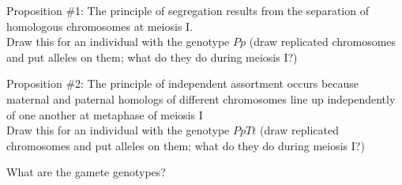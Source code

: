 \begin{frame}[t]
    \begin{adjustwidth}{-2em}{-2em}
    \vspace{-4mm}
    Proposition \#1: The principle of segregation results from the separation
    of homologous chromosomes at meiosis I. \\

    \vspace{3mm}
    Draw this for an individual with the genotype $Pp$ (draw replicated
    chromosomes and put alleles on them; what do they do during meiosis I?) \\

    
    \end{adjustwidth}

\end{frame}

\begin{frame}[t]
    \begin{adjustwidth}{-2em}{-2em}
    \vspace{-4mm}
    Proposition \#2: The principle of independent assortment occurs because
    maternal and paternal homologs of different chromosomes line up
    independently of one another at metaphase of meiosis I \\

    \vspace{3mm}
    Draw this for an individual with the genotype $PpTt$ (draw replicated
    chromosomes and put alleles on them; what do they do during meiosis I?) \\


    \vspace{0.42\textheight}
    What are the gamete genotypes? 

    \end{adjustwidth}

\end{frame}

